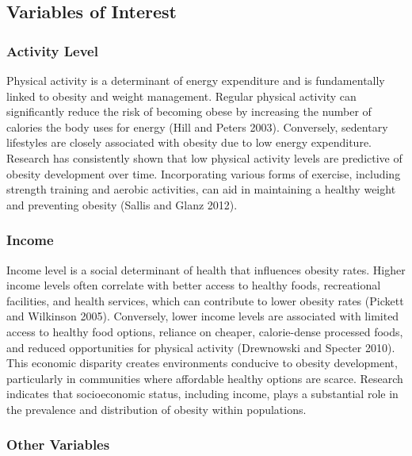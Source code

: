 \documentclass[
  letterpaper,
  DIV=11,
  numbers=noendperiod]{scrartcl}
\begin{document}
\hypertarget{variables-of-interest}{%
\subsection{Variables of Interest}\label{variables-of-interest}}

\hypertarget{activity-level}{%
\subsubsection{Activity Level}\label{activity-level}}

Physical activity is a determinant of energy expenditure and is
fundamentally linked to obesity and weight management. Regular physical
activity can significantly reduce the risk of becoming obese by
increasing the number of calories the body uses for energy (Hill and
Peters 2003). Conversely, sedentary lifestyles are closely associated
with obesity due to low energy expenditure. Research has consistently
shown that low physical activity levels are predictive of obesity
development over time. Incorporating various forms of exercise,
including strength training and aerobic activities, can aid in
maintaining a healthy weight and preventing obesity (Sallis and Glanz
2012).

\hypertarget{income}{%
\subsubsection{Income}\label{income}}

Income level is a social determinant of health that influences obesity
rates. Higher income levels often correlate with better access to
healthy foods, recreational facilities, and health services, which can
contribute to lower obesity rates (Pickett and Wilkinson 2005).
Conversely, lower income levels are associated with limited access to
healthy food options, reliance on cheaper, calorie-dense processed
foods, and reduced opportunities for physical activity (Drewnowski and
Specter 2010). This economic disparity creates environments conducive to
obesity development, particularly in communities where affordable
healthy options are scarce. Research indicates that socioeconomic
status, including income, plays a substantial role in the prevalence and
distribution of obesity within populations.

\hypertarget{other-variables}{%
\subsubsection{Other Variables}\label{other-variables}}
\end{document}
